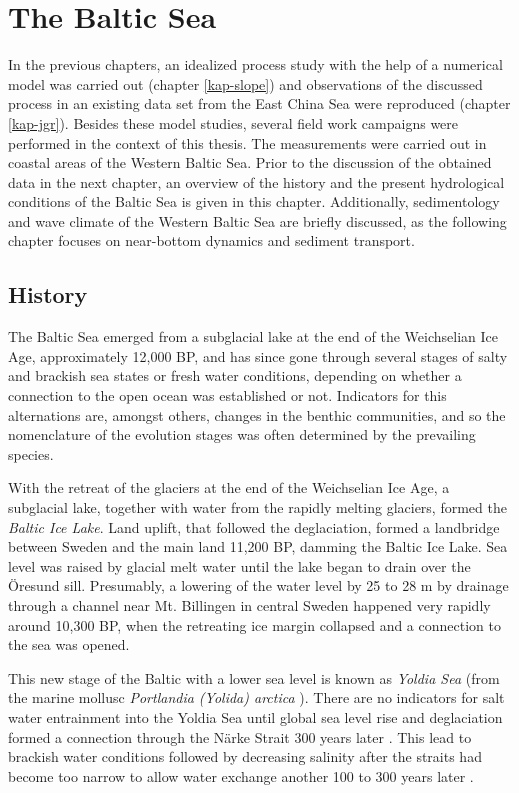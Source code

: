 \chapter{The Baltic Sea}
\label{kap-einleitung}

In the previous chapters, an idealized process study with the help of a 
numerical model was carried out (chapter \ref{kap-slope}) and observations of 
the discussed process in an existing data set from the East China Sea were 
reproduced (chapter \ref{kap-jgr}). Besides these model studies, several field 
work campaigns were performed in the context of this thesis. The measurements 
were carried out in coastal areas of the Western Baltic Sea. Prior to the 
discussion of the obtained data in the next chapter, an overview of the history 
and the present hydrological conditions of the Baltic Sea is given in this 
chapter. Additionally, sedimentology and wave climate of the Western Baltic Sea 
are briefly discussed, as the following chapter focuses on near-bottom dynamics 
and sediment transport.

\section{History}

The Baltic Sea emerged from a subglacial lake at the end of the Weichselian Ice 
Age, approximately 12,000 BP, and has since gone through several stages of 
salty and brackish sea states or fresh water conditions, depending on whether a 
connection to the open ocean was established or not. Indicators for this 
alternations are, amongst others, changes in the benthic communities, and so the 
nomenclature of the evolution stages was often determined by the prevailing 
species.

With the retreat of the glaciers at the end of the Weichselian Ice Age, a 
subglacial lake, together with water from the rapidly melting glaciers, formed 
the \textit{Baltic Ice Lake}. Land uplift, that followed the deglaciation, 
formed a landbridge between Sweden and the main land 11,200 BP, damming the 
Baltic Ice Lake. Sea level was raised by glacial melt water until the lake began 
to drain over the Öresund sill. Presumably, a lowering of the water level by 25 
to 28 m by drainage through a channel near Mt. Billingen in central Sweden 
happened very rapidly around 10,300 BP, when the retreating ice margin collapsed 
\citep[][]{bjoerk95,tikkanen2002} and a connection to the sea was opened. 

This new stage of the Baltic with a lower sea level is known as \textit{Yoldia 
Sea} (from the marine mollusc \textit{Portlandia (Yolida) arctica} 
\citep[][]{schoning2001}). There are no indicators for salt water entrainment 
into the Yoldia Sea until global sea level rise and deglaciation formed a 
connection through the Närke Strait 300 years later \citep[][]{schoning2001}. 
This lead to brackish water conditions followed by decreasing salinity after the 
straits had become too narrow to allow water exchange another 100 to 300 years 
later \citep[][]{bjoerk95}.

